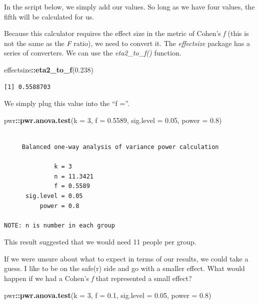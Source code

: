 \documentclass[
  11pt,
]{book}
\newenvironment{Shaded}{\begin{snugshade}}{\end{snugshade}}
\newcommand{\AttributeTok}[1]{\textcolor[rgb]{0.27,0.27,0.27}{#1}}
\newcommand{\DecValTok}[1]{\textcolor[rgb]{0.06,0.06,0.06}{#1}}
\newcommand{\FloatTok}[1]{\textcolor[rgb]{0.06,0.06,0.06}{#1}}
\newcommand{\FunctionTok}[1]{\textcolor[rgb]{0.27,0.27,0.27}{\textbf{#1}}}
\newcommand{\NormalTok}[1]{#1}
\newcommand{\SpecialCharTok}[1]{\textcolor[rgb]{0.43,0.43,0.43}{\textbf{#1}}}
\begin{document}
In the script below, we simply add our values. So long as we have four values, the fifth will be calculated for us.

Because this calculator requires the effect size in the metric of Cohen's \emph{f} (this is not the same as the \emph{F} ratio), we need to convert it. The \emph{effectsize} package has a series of converters. We can use the \emph{eta2\_to\_f()} function.

\begin{Shaded}
\begin{Highlighting}[]
\NormalTok{effectsize}\SpecialCharTok{::}\FunctionTok{eta2\_to\_f}\NormalTok{(}\FloatTok{0.238}\NormalTok{)}
\end{Highlighting}
\end{Shaded}

\begin{verbatim}
[1] 0.5588703
\end{verbatim}

We simply plug this value into the ``f =''.

\begin{Shaded}
\begin{Highlighting}[]
\NormalTok{pwr}\SpecialCharTok{::}\FunctionTok{pwr.anova.test}\NormalTok{(}\AttributeTok{k =} \DecValTok{3}\NormalTok{, }\AttributeTok{f =} \FloatTok{0.5589}\NormalTok{, }\AttributeTok{sig.level =} \FloatTok{0.05}\NormalTok{, }\AttributeTok{power =} \FloatTok{0.8}\NormalTok{)}
\end{Highlighting}
\end{Shaded}

\begin{verbatim}

     Balanced one-way analysis of variance power calculation 

              k = 3
              n = 11.3421
              f = 0.5589
      sig.level = 0.05
          power = 0.8

NOTE: n is number in each group
\end{verbatim}

This result suggested that we would need 11 people per group.

If we were unsure about what to expect in terms of our results, we could take a guess. I like to be on the safe(r) side and go with a smaller effect. What would happen if we had a Cohen's \emph{f} that represented a small effect?

\begin{Shaded}
\begin{Highlighting}[]
\NormalTok{pwr}\SpecialCharTok{::}\FunctionTok{pwr.anova.test}\NormalTok{(}\AttributeTok{k =} \DecValTok{3}\NormalTok{, }\AttributeTok{f =} \FloatTok{0.1}\NormalTok{, }\AttributeTok{sig.level =} \FloatTok{0.05}\NormalTok{, }\AttributeTok{power =} \FloatTok{0.8}\NormalTok{)}
\end{Highlighting}
\end{Shaded}
\end{document}
